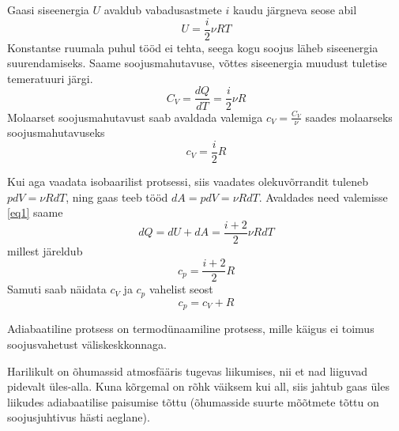 \documentclass{trkut}%
\begin{document}
Gaasi siseenergia $U$ avaldub vabadusastmete $i$ kaudu järgneva seose abil
\begin{equation}\label{eq5}
U = \frac{i}{2} \nu R T
\end{equation}
Konstantse ruumala puhul tööd ei tehta, seega kogu soojus läheb siseenergia suurendamiseks. Saame soojusmahutavuse, võttes siseenergia muudust tuletise temeratuuri järgi.
\begin{equation}\label{eq6}
C_V = \frac{dQ}{dT}=\frac{i}{2}\nu R
\end{equation}
Molaarset soojusmahutavust saab avaldada valemiga $c_V = \frac{C_V}{\nu}$ saades molaarseks soojusmahutavuseks
\begin{equation}\label{eq7}
c_V = \frac{i}{2}R
\end{equation}

Kui aga vaadata isobaarilist protsessi, siis vaadates olekuvõrrandit tuleneb $pdV=\nu RdT$, ning gaas teeb tööd $dA = pdV = \nu RdT$. Avaldades need valemisse \ref{eq1} saame
\begin{equation*}
dQ = dU + dA = \frac{i+2}{2} \nu R dT
\end{equation*}
millest järeldub
\begin{equation*}
c_p=\frac{i+2}{2}R
\end{equation*}
Samuti saab näidata $c_V$ ja $c_p$ vahelist seost
\begin{equation}\label{eq9}
c_p = c_V + R
\end{equation}

Adiabaatiline protsess on termodünaamiline protsess, mille käigus ei toimus soojusvahetust väliskeskkonnaga.

Harilikult on õhumassid atmosfääris tugevas liikumises, nii et nad liiguvad pidevalt üles-alla. Kuna kõrgemal on rõhk väiksem kui all, siis jahtub gaas üles liikudes adiabaatilise paisumise tõttu (õhumasside suurte mõõtmete tõttu on soojusjuhtivus hästi aeglane).
\end{document}
